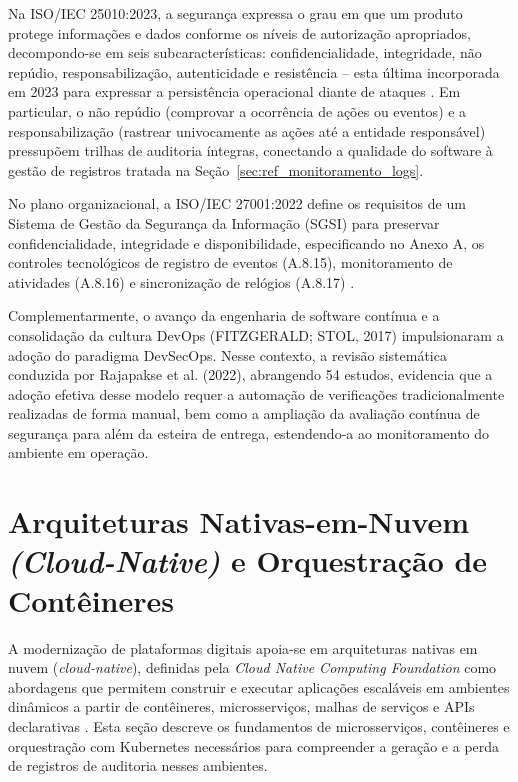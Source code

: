 Na ISO/IEC 25010:2023, a segurança expressa o grau em que um produto protege informações e dados conforme os níveis de autorização apropriados, decompondo-se em seis subcaracterísticas: confidencialidade, integridade, não repúdio, responsabilização, autenticidade e resistência -- esta última incorporada em 2023 para expressar a persistência operacional diante de ataques \cite{iso25010_2023}. Em particular, o não repúdio (comprovar a ocorrência de ações ou eventos) e a responsabilização (rastrear univocamente as ações até a entidade responsável) pressupõem trilhas de auditoria íntegras, conectando a qualidade do software à gestão de registros tratada na Seção~\ref{sec:ref_monitoramento_logs}.

No plano organizacional, a ISO/IEC 27001:2022 define os requisitos de um Sistema de Gestão da Segurança da Informação (SGSI) para preservar confidencialidade, integridade e disponibilidade, especificando no Anexo A, os controles tecnológicos de registro de eventos (A.8.15), monitoramento de atividades (A.8.16) e sincronização de relógios (A.8.17) \cite{iso27001_2022}.

Complementarmente, o avanço da engenharia de software contínua e a consolidação da cultura DevOps (FITZGERALD; STOL, 2017) impulsionaram a adoção do paradigma DevSecOps. Nesse contexto, a revisão sistemática conduzida por Rajapakse et al. (2022), abrangendo 54 estudos, evidencia que a adoção efetiva desse modelo requer a automação de verificações tradicionalmente realizadas de forma manual, bem como a ampliação da avaliação contínua de segurança para além da esteira de entrega, estendendo-a ao monitoramento do ambiente em operação.

\section{Arquiteturas Nativas-em-Nuvem \textit{(Cloud-Native)} e Orquestração de Contêineres}
\label{sec:ref_cloud_native}

A modernização de plataformas digitais apoia-se em arquiteturas nativas em nuvem (\textit{cloud-native}), definidas pela \textit{Cloud Native Computing Foundation} como abordagens que permitem construir e executar aplicações escaláveis em ambientes dinâmicos a partir de contêineres, microsserviços, malhas de serviços e APIs declarativas \cite{cncf2024}. Esta seção descreve os fundamentos de microsserviços, contêineres e orquestração com Kubernetes necessários para compreender a geração e a perda de registros de auditoria nesses ambientes.

